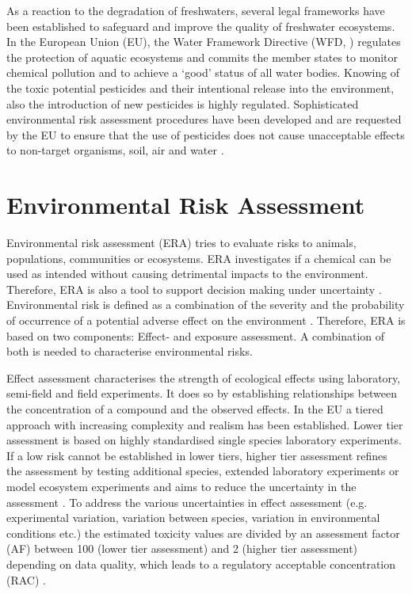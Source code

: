 As a reaction to the degradation of freshwaters, several legal frameworks have been established to safeguard and improve the quality of freshwater ecosystems. 
In the European Union (EU), the Water Framework Directive (WFD, \citet{european_union_directive_2000}) regulates the protection of aquatic ecosystems and commits the member states to monitor chemical pollution and to achieve a `good' status of all water bodies. 
Knowing of the toxic potential pesticides and their intentional release into the environment, also the introduction of new pesticides is highly regulated.
Sophisticated environmental risk assessment procedures have been developed and are requested by the EU to ensure that the use of pesticides does not cause unacceptable effects to non-target organisms, soil, air and water \citep{european_union_regulation_2009}. 



\section{Environmental Risk Assessment}

Environmental risk assessment (ERA) tries to evaluate risks to animals, populations, communities or ecosystems.
ERA investigates if a chemical can be used as intended without causing detrimental impacts to the environment.
Therefore, ERA is also a tool to support decision making under uncertainty \citep{newman_fundamentals_2015}. 
Environmental risk is defined as a combination of the severity and the probability of occurrence of a potential adverse effect on the environment \citep{suter_ecological_2007}. 
Therefore, ERA is based on two components: Effect- and exposure assessment.
A combination of both is needed to characterise environmental risks.

Effect assessment characterises the strength of ecological effects using laboratory, semi-field and field experiments.
It does so by establishing relationships between the concentration of a compound and the observed effects.
In the EU a tiered approach with increasing complexity and realism has been established.
Lower tier assessment is based on highly standardised single species laboratory experiments.
If a low risk cannot be established in lower tiers, higher tier assessment refines the assessment by testing additional species, extended laboratory experiments or model ecosystem experiments and aims to reduce the uncertainty in the assessment \citep{efsa_guidance_2013, brock_aquatic_2006}. 
To address the various uncertainties in effect assessment (e.g. experimental variation, variation between species, variation in environmental conditions etc.) the estimated toxicity values are divided by an assessment factor (AF) between 100 (lower tier assessment) and 2 (higher tier assessment) depending on data quality, which leads to a regulatory acceptable concentration (RAC) \citep{efsa_guidance_2013, brock_aquatic_2006}. 

